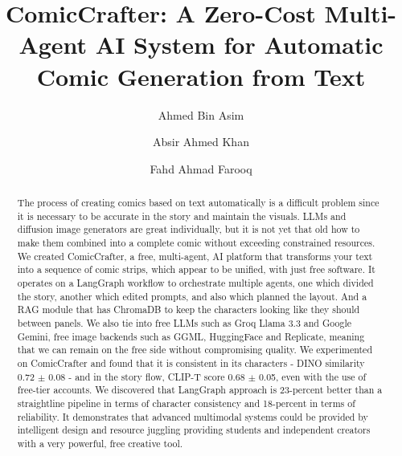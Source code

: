\documentclass[runningheads]{llncs}
\begin{document}
\title{ComicCrafter: A Zero-Cost Multi-Agent AI System for Automatic Comic Generation from Text}

\author{Ahmed Bin Asim \and
Absir Ahmed Khan \and
Fahd Ahmad Farooq}



\maketitle

\begin{abstract}
The process of creating comics based on text automatically is a difficult problem since it is necessary to be accurate in the story and maintain the visuals. LLMs and diffusion image generators are great individually, but it is not yet that old how to make them combined into a complete comic without exceeding constrained resources.
We created ComicCrafter, a free, multi-agent, AI platform that transforms your text into a sequence of comic strips, which appear to be unified, with just free software.
It operates on a LangGraph workflow to orchestrate multiple agents, one which divided the story, another which edited prompts, and also which planned the layout. And a RAG module that has ChromaDB to keep the characters looking like they should between panels.
We also tie into free LLMs such as Groq Llama 3.3 and Google Gemini, free image backends such as GGML, HuggingFace and Replicate, meaning that we can remain on the free side without compromising quality.
We experimented on ComicCrafter and found that it is consistent in its characters - DINO similarity 0.72 $\pm$ 0.08 - and in the story flow, CLIP-T score 0.68 $\pm$ 0.05, even with the use of free-tier accounts.
We discovered that LangGraph approach is 23-percent better than a straightline pipeline in terms of character consistency and 18-percent in terms of reliability. It demonstrates that advanced multimodal systems could be provided by intelligent design and resource juggling providing students and independent creators with a very powerful, free creative tool.

\end{abstract}
\end{document}
